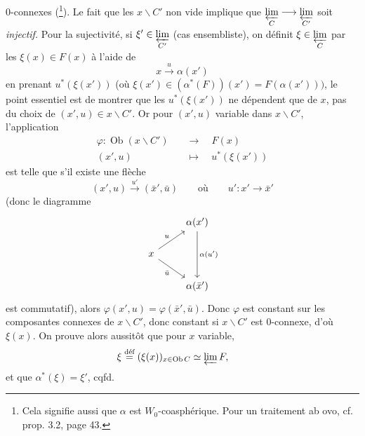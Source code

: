 0-connexes (\footnote[4]{Cela signifie aussi que $\alpha$ est $W_0$-coasphérique. Pour un traitement ab ovo, cf. prop. 3.2, page 43.}). Le fait que les $x\backslash C'$ non vide implique que $\varprojlim\limits_{C} \longrightarrow \varprojlim\limits_{C'}$ soit \textit{injectif.} Pour la sujectivité, si $\xi' \in \varprojlim\limits_{C'}$ (cas ensembliste), on définit $\xi \in \varprojlim\limits_{C}$ par les $\xi(x) \in F(x)$ à l'aide de %
\[ x \xrightarrow{u} \alpha(x') \]
en prenant $u^*(\xi(x'))$ (où $\xi(x') \in (\alpha^*(F))(x') = F(\alpha(x')))$, le point essentiel est de montrer que les $u^*(\xi(x'))$ ne dépendent que de $x$, pas du choix de $(x',u) \in x\backslash C'$. Or pour $(x',u)$ variable dans $x\backslash C'$, l'application
\[
\begin{aligned}
\varphi : \operatorname{Ob}(x\backslash C') &\quad\longrightarrow\quad F(x)\\
(x',u) &\quad\longmapsto\quad u^*(\xi(x'))
\end{aligned}
\]
est telle que s'il existe une flèche
\[ (x',u) \xrightarrow{u'} (\bar{x}',\bar{u}) \qquad \text{où} \qquad u' : x' \longrightarrow \bar{x}' \]
(donc le diagramme
\[
\begin{tikzcd}
 & \alpha(x') \arrow[dd, "\alpha(u')"] \\
x \arrow[ur, "u"] \arrow[dr, "\bar{u}"'] & \\
 & \alpha(\bar{x}')
\end{tikzcd}
\]
est commutatif), alors $\varphi(x',u) = \varphi(\bar{x}',\bar{u})$. Donc $\varphi$ est constant sur les composantes connexes de $x\backslash C'$, donc constant si $x\backslash C'$ est 0-connexe, d'où $\xi(x)$. On prouve alors aussitôt que pour $x$ variable,
\[ \xi \overset{\text{déf}}{=} (\xi(x))_{x\in\operatorname{Ob} C} \simeq \varprojlim F, \qquad \]
et que $\alpha^*(\xi) = \xi'$, cqfd.

